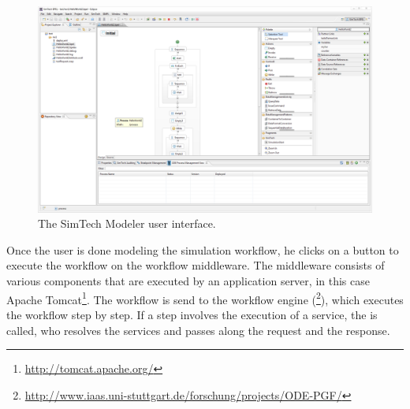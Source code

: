 \begin{figure}[!htbp]
	\centering
	\includegraphics[width=\textwidth,interpolate=false]{fundamentals/assets/simtech_modeler}
	\caption{The SimTech Modeler user interface.}
	\label{image:modeler}
\end{figure}

Once the user is done modeling the simulation workflow, he clicks on a button to execute the workflow on the workflow middleware.
The middleware consists of various components that are executed by an application server, in this case Apache Tomcat\footnote{\url{http://tomcat.apache.org/}}.
The workflow is send to the workflow engine (\footnote{\url{http://www.iaas.uni-stuttgart.de/forschung/projects/ODE-PGF/}}), which executes the workflow step by step.
If a step involves the execution of a service, the  is called, who resolves the services and passes along the request and the response.
